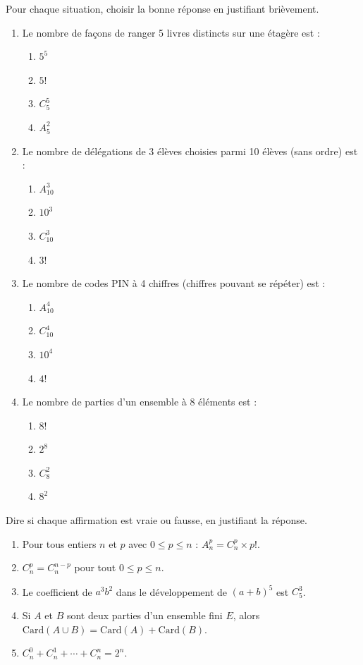 \documentclass[11pt]{article}
\begin{document}
\begin{exercice}
Pour chaque situation, choisir la bonne réponse en justifiant brièvement.
\begin{enumerate}
\item Le nombre de façons de ranger 5 livres distincts sur une étagère est :
\begin{enumerate}
\item $5^5$ \qquad \item $5!$ \qquad \item $C_5^5$ \qquad \item $A_5^2$
\end{enumerate}
\item Le nombre de délégations de 3 élèves choisies parmi 10 élèves (sans ordre) est :
\begin{enumerate}
\item $A_{10}^3$ \qquad \item $10^3$ \qquad \item $C_{10}^3$ \qquad \item $3!$
\end{enumerate}
\item Le nombre de codes PIN à 4 chiffres (chiffres pouvant se répéter) est :
\begin{enumerate}
\item $A_{10}^4$ \qquad \item $C_{10}^4$ \qquad \item $10^4$ \qquad \item $4!$
\end{enumerate}
\item Le nombre de parties d'un ensemble à 8 éléments est :
\begin{enumerate}
\item $8!$ \qquad \item $2^8$ \qquad \item $C_8^2$ \qquad \item $8^2$
\end{enumerate}
\end{enumerate}
\end{exercice}

\begin{exercice}
Dire si chaque affirmation est vraie ou fausse, en justifiant la réponse.
\begin{enumerate}
\item Pour tous entiers $n$ et $p$ avec $0 \le p \le n$ : $A_n^p = C_n^p \times p!$.
\item $C_n^p = C_n^{n-p}$ pour tout $0 \le p \le n$.
\item Le coefficient de $a^3 b^2$ dans le développement de $(a+b)^5$ est $C_5^3$.
\item Si $A$ et $B$ sont deux parties d'un ensemble fini $E$, alors $\mathrm{Card}(A \cup B) = \mathrm{Card}(A) + \mathrm{Card}(B)$.
\item $C_n^0 + C_n^1 + \cdots + C_n^n = 2^n$.
\end{enumerate}
\end{exercice}
\end{document}
